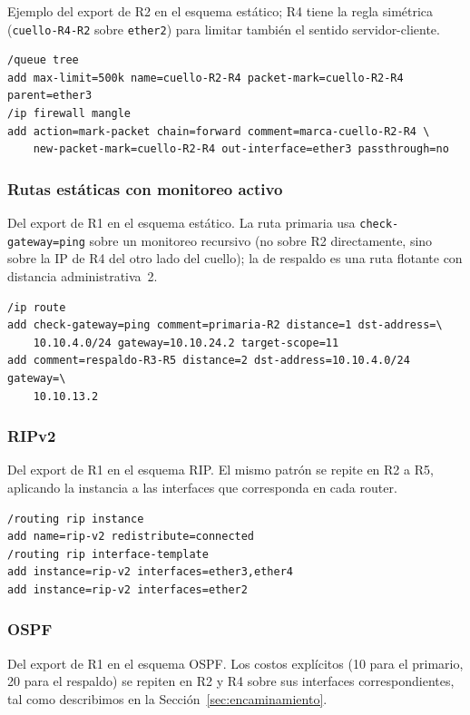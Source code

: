 \documentclass[11pt,a4paper]{article}
\begin{document}
Ejemplo del export de R2 en el esquema est\'atico; R4 tiene la regla sim\'etrica (\texttt{cuello-R4-R2} sobre \texttt{ether2}) para limitar tambi\'en el sentido servidor-cliente.

{\scriptsize
\begin{verbatim}
/queue tree
add max-limit=500k name=cuello-R2-R4 packet-mark=cuello-R2-R4 parent=ether3
/ip firewall mangle
add action=mark-packet chain=forward comment=marca-cuello-R2-R4 \
    new-packet-mark=cuello-R2-R4 out-interface=ether3 passthrough=no
\end{verbatim}
}

\subsubsection*{Rutas est\'aticas con monitoreo activo}

Del export de R1 en el esquema est\'atico. La ruta primaria usa \texttt{check-gateway=ping} sobre un monitoreo recursivo (no sobre R2 directamente, sino sobre la IP de R4 del otro lado del cuello); la de respaldo es una ruta flotante con distancia administrativa~2.

{\scriptsize
\begin{verbatim}
/ip route
add check-gateway=ping comment=primaria-R2 distance=1 dst-address=\
    10.10.4.0/24 gateway=10.10.24.2 target-scope=11
add comment=respaldo-R3-R5 distance=2 dst-address=10.10.4.0/24 gateway=\
    10.10.13.2
\end{verbatim}
}

\subsubsection*{RIPv2}

Del export de R1 en el esquema RIP. El mismo patr\'on se repite en R2 a R5, aplicando la instancia a las interfaces que corresponda en cada router.

{\scriptsize
\begin{verbatim}
/routing rip instance
add name=rip-v2 redistribute=connected
/routing rip interface-template
add instance=rip-v2 interfaces=ether3,ether4
add instance=rip-v2 interfaces=ether2
\end{verbatim}
}

\subsubsection*{OSPF}

Del export de R1 en el esquema OSPF. Los costos expl\'icitos (10 para el primario, 20 para el respaldo) se repiten en R2 y R4 sobre sus interfaces correspondientes, tal como describimos en la Secci\'on~\ref{sec:encaminamiento}.
\end{document}
